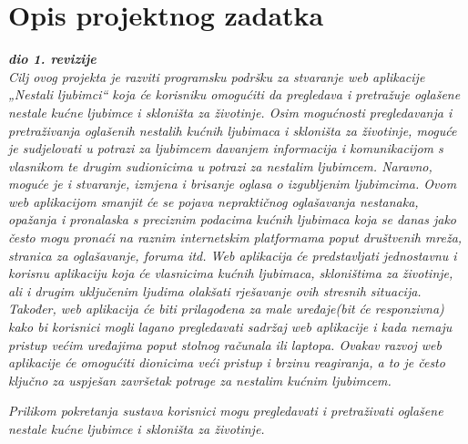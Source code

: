 \chapter{Opis projektnog zadatka}
		
		\textbf{\textit{dio 1. revizije}}\\
		
		\textit{Cilj ovog projekta je razviti programsku podršku za stvaranje web aplikacije „Nestali ljubimci“ koja će korisniku omogućiti da pregledava i pretražuje oglašene nestale kućne ljubimce i skloništa za životinje. Osim mogućnosti pregledavanja i pretraživanja oglašenih nestalih kućnih ljubimaca i skloništa za životinje, moguće je sudjelovati u potrazi za ljubimcem davanjem informacija i komunikacijom s vlasnikom te drugim sudionicima u potrazi za nestalim ljubimcem. Naravno, moguće je i stvaranje, izmjena i brisanje oglasa o izgubljenim ljubimcima. Ovom web aplikacijom smanjit će se pojava nepraktičnog oglašavanja nestanaka, opažanja i pronalaska s preciznim podacima kućnih ljubimaca koja se danas jako često mogu pronaći na raznim internetskim platformama poput društvenih mreža, stranica za oglašavanje, foruma itd. Web aplikacija će predstavljati jednostavnu i korisnu aplikaciju koja će vlasnicima kućnih ljubimaca, skloništima za životinje, ali i drugim uključenim ljudima olakšati rješavanje ovih stresnih situacija. Također, web aplikacija će biti prilagođena za male uređaje(bit će responzivna) kako bi korisnici mogli lagano pregledavati sadržaj web aplikacije i kada nemaju pristup većim uređajima poput stolnog računala ili laptopa. Ovakav razvoj web aplikacije će omogućiti dionicima veći pristup i brzinu reagiranja, a to je često ključno za uspješan završetak potrage za nestalim kućnim ljubimcem.}
		
		\textit{Prilikom pokretanja sustava korisnici mogu pregledavati i pretraživati oglašene nestale kućne ljubimce i skloništa za životinje.}
		
